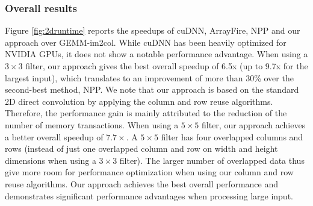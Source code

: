 \subsubsection{Overall results}
 Figure
\ref{fig:2druntime} reports the speedups of cuDNN, ArrayFire, NPP and our approach over GEMM-im2col. While cuDNN has been heavily optimized
for NVIDIA GPUs, it does not show a notable performance advantage. When using a $3 \times 3$ filter, our approach gives the best overall
speedup of 6.5x (up to 9.7x for the largest input), which translates to an improvement of  more than 30\% over the second-best method, NPP.
We note that our approach is based on the standard 2D direct convolution by applying the column and row reuse algorithms. Therefore, the
performance gain is mainly attributed to the reduction of the number of memory transactions. When using a $5 \times 5$ filter, our approach
achieves a better overall speedup of $7.7\times$. A $5 \times 5$ filter has four overlapped columns and rows (instead of just one
overlapped column and row on width and height dimensions when using a $3 \times 3$ filter). The larger number of overlapped data thus give
more room for performance optimization when using our column and row reuse algorithms. Our approach achieves the best overall performance
and demonstrates significant performance advantages when processing large input.

